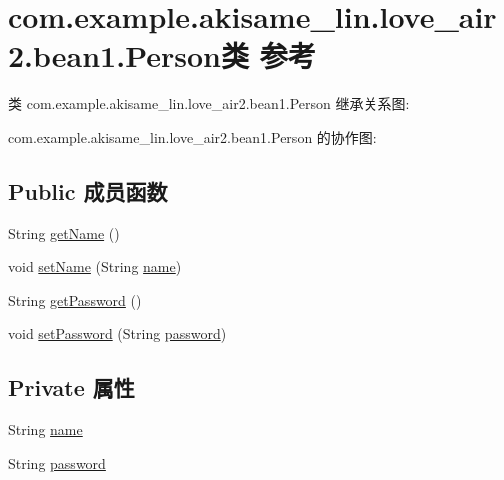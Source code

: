 \hypertarget{classcom_1_1example_1_1akisame__lin_1_1love__air2_1_1bean1_1_1_person}{}\section{com.\+example.\+akisame\+\_\+lin.\+love\+\_\+air2.\+bean1.\+Person类 参考}
\label{classcom_1_1example_1_1akisame__lin_1_1love__air2_1_1bean1_1_1_person}


类 com.\+example.\+akisame\+\_\+lin.\+love\+\_\+air2.\+bean1.\+Person 继承关系图\+:


com.\+example.\+akisame\+\_\+lin.\+love\+\_\+air2.\+bean1.\+Person 的协作图\+:
\subsection*{Public 成员函数}
\begin{DoxyCompactItemize}
\item 
String \mbox{\hyperlink{classcom_1_1example_1_1akisame__lin_1_1love__air2_1_1bean1_1_1_person_a799247cea06a84f377f521e0e227e3a5}{get\+Name}} ()
\item 
void \mbox{\hyperlink{classcom_1_1example_1_1akisame__lin_1_1love__air2_1_1bean1_1_1_person_a9e591cba6161609e0e3bbe9a89997dd5}{set\+Name}} (String \mbox{\hyperlink{classcom_1_1example_1_1akisame__lin_1_1love__air2_1_1bean1_1_1_person_a5b42288f559a6f4133a8821d7a9b045a}{name}})
\item 
String \mbox{\hyperlink{classcom_1_1example_1_1akisame__lin_1_1love__air2_1_1bean1_1_1_person_a3e3a150d9d99c2be943e9e4462a91da9}{get\+Password}} ()
\item 
void \mbox{\hyperlink{classcom_1_1example_1_1akisame__lin_1_1love__air2_1_1bean1_1_1_person_a4cb8303ff617437e05444f6f9d68e6ad}{set\+Password}} (String \mbox{\hyperlink{classcom_1_1example_1_1akisame__lin_1_1love__air2_1_1bean1_1_1_person_a2cc3eddf110957b6c0ae2a3e8065e9a0}{password}})
\end{DoxyCompactItemize}
\subsection*{Private 属性}
\begin{DoxyCompactItemize}
\item 
String \mbox{\hyperlink{classcom_1_1example_1_1akisame__lin_1_1love__air2_1_1bean1_1_1_person_a5b42288f559a6f4133a8821d7a9b045a}{name}}
\item 
String \mbox{\hyperlink{classcom_1_1example_1_1akisame__lin_1_1love__air2_1_1bean1_1_1_person_a2cc3eddf110957b6c0ae2a3e8065e9a0}{password}}
\end{DoxyCompactItemize}


